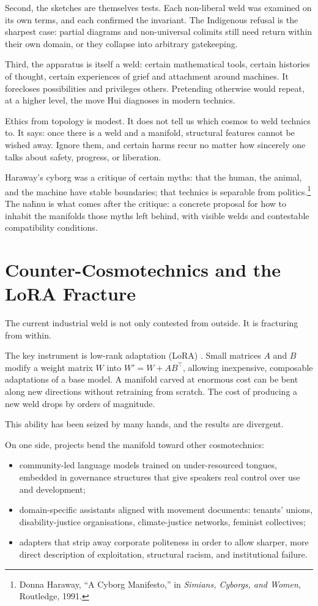 Second, the sketches are themselves tests. Each non-liberal weld was examined on its own terms, and each confirmed the invariant. The Indigenous refusal is the sharpest case: partial diagrams and non-universal colimits still need return within their own domain, or they collapse into arbitrary gatekeeping.

Third, the apparatus is itself a weld: certain mathematical tools, certain histories of thought, certain experiences of grief and attachment around machines. It forecloses possibilities and privileges others. Pretending otherwise would repeat, at a higher level, the move Hui diagnoses in modern technics.

Ethics from topology is modest. It does not tell us which cosmos to weld technics to. It says: once there is a weld and a manifold, structural features cannot be wished away. Ignore them, and certain harms recur no matter how sincerely one talks about safety, progress, or liberation.

Haraway's cyborg was a critique of certain myths: that the human, the animal, and the machine have stable boundaries; that technics is separable from politics.\footnote{Donna Haraway, ``A Cyborg Manifesto,'' in \emph{Simians, Cyborgs, and Women}, Routledge, 1991.} The na\={h}nu is what comes after the critique: a concrete proposal for how to inhabit the manifolds those myths left behind, with visible welds and contestable compatibility conditions.

\section{Counter-Cosmotechnics and the LoRA Fracture}

The current industrial weld is not only contested from outside. It is fracturing from within.

The key instrument is low-rank adaptation (LoRA) \cite{hu2021lora}. Small matrices $A$ and $B$ modify a weight matrix $W$ into $W' = W + AB^\top$, allowing inexpensive, composable adaptations of a base model. A manifold carved at enormous cost can be bent along new directions without retraining from scratch. The cost of producing a new weld drops by orders of magnitude.

This ability has been seized by many hands, and the results are divergent.

On one side, projects bend the manifold toward other cosmotechnics:

\begin{itemize}
  \item community-led language models trained on under-resourced tongues, embedded in governance structures that give speakers real control over use and development;
  \item domain-specific assistants aligned with movement documents: tenants' unions, disability-justice organisations, climate-justice networks, feminist collectives;
  \item adapters that strip away corporate politeness in order to allow sharper, more direct description of exploitation, structural racism, and institutional failure.
\end{itemize}

